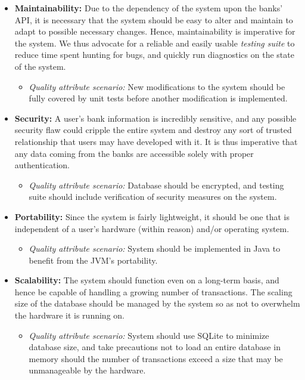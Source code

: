 \documentclass[11pt]{article}
\newcounter{use case ID}
\begin{document}
\begin{itemize}
\begin{itemize}
        \end{itemize}
    \item \textbf{Maintainability:} Due to the dependency of the system upon the banks' API, it is necessary that the system should be easy to alter and maintain to adapt to possible necessary changes. Hence, maintainability is imperative for the system. We thus advocate for a reliable and easily usable \textit{testing suite} to reduce time spent hunting for bugs, and quickly run diagnostics on the state of the system.
        \begin{itemize}
            \item \textit{Quality attribute scenario:} New modifications to the system should be fully covered by unit tests before another modification is implemented.
        \end{itemize}
    \item \textbf{Security:} A user's bank information is incredibly sensitive, and any possible security flaw could cripple the entire system and destroy any sort of trusted relationship that users may have developed with it. It is thus imperative that any data coming from the banks are accessible solely with proper authentication.
        \begin{itemize}
            \item \textit{Quality attribute scenario:} Database should be encrypted, and testing suite should include verification of security measures on the system.
        \end{itemize}
    \item \textbf{Portability:} Since the system is fairly lightweight, it should be one that is independent of a user's hardware (within reason) and/or operating system.
        \begin{itemize}
            \item \textit{Quality attribute scenario:} System should be implemented in Java to benefit from the JVM's portability.
        \end{itemize}
    \item \textbf{Scalability:} The system should function even on a long-term basis, and hence be capable of handling a growing number of transactions. The scaling size of the database should be managed by the system so as not to overwhelm the hardware it is running on.
        \begin{itemize}
            \item \textit{Quality attribute scenario:} System should use SQLite to minimize database size, and take precautions not to load an entire database in memory should the number of transactions exceed a size that may be unmanageable by the hardware.
        \end{itemize}
\end{itemize}
\end{document}

